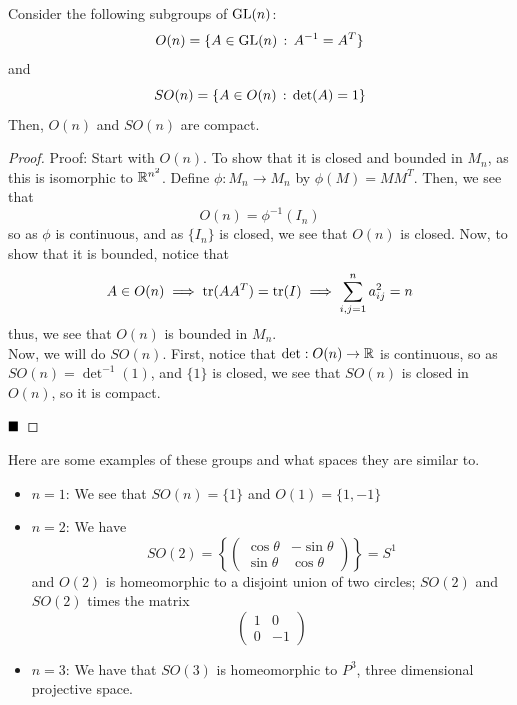\begin{lemma}
    Consider the following subgroups of $\tt{GL}(n)$:
    \[ O(n) = \{A \in \tt{GL}(n) \col A^{-1} = A^{T}\} \]
    and
    \[ SO(n) = \{A \in O(n) \col \det(A) = 1\} \]
    Then, $O(n)$ and $SO(n)$ are compact. 
\end{lemma}
\begin{proof}{Proof:}
    Start with $O(n)$. To show that it is closed and bounded in $M_n$, as this is isomorphic to $\R^{n^2}$. Define $\phi : M_{n} \to M_{n}$ by $\phi(M) = MM^{T}$. Then, we see that
    \[ O(n) = \phi^{-1}(I_{n}) \]
    so as $\phi$ is continuous, and as $\{I_{n}\}$ is closed, we see that $O(n)$ is closed. Now, to show that it is bounded, notice that
    \[ A \in O(n) \implies \tt{tr}(AA^{T}) = \tt{tr}(I) \implies \sum_{i, j = 1}^{n} a_{ij}^2 = n \]
    thus, we see that $O(n)$ is bounded in $M_{n}$.\\

    Now, we will do $SO(n)$. First, notice that $\det : O(n) \to \R$ is continuous, so as $SO(n) = \det^{-1}(1)$, and $\{1\}$ is closed, we see that $SO(n)$ is closed in $O(n)$, so it is compact. 

    $\qed$
\end{proof}

Here are some examples of these groups and what spaces they are similar to.
\begin{itemize}
    \item $n = 1$: We see that $SO(n) = \{1\}$ and $O(1) = \{1, -1\}$\\
    \item $n = 2$: We have
    \[ SO(2) = \left\{\begin{pmatrix} \cos \theta & -\sin \theta \\ \sin \theta & \cos \theta\end{pmatrix}\right\} = S^1 \]
    and $O(2)$ is homeomorphic to a disjoint union of two circles; $SO(2)$ and $SO(2)$ times the matrix
    \[ \begin{pmatrix} 1 & 0 \\ 0 & -1 \end{pmatrix} \]
    \item $n = 3$: We have that $SO(3)$ is homeomorphic to $P^3$, three dimensional projective space. 
\end{itemize}